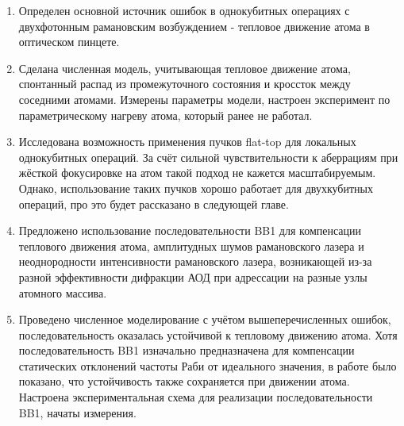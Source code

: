 \begin{enumerate}
	\item Определен основной источник ошибок в однокубитных операциях с двухфотонным рамановским возбуждением - тепловое движение атома в оптическом пинцете.
	\item Сделана численная модель, учитывающая тепловое движение атома, спонтанный распад из промежуточного состояния и кроссток между соседними атомами. Измерены параметры модели, настроен эксперимент по параметрическому нагреву атома, который ранее не работал.
	\item Исследована возможность применения пучков flat-top для локальных однокубитных операций. За счёт сильной чувствительности к аберрациям при жёсткой фокусировке на атом такой подход не кажется масштабируемым. Однако, использование таких пучков хорошо работает для двухкубитных операций, про это будет рассказано в следующей главе.
	\item Предложено использование последовательности BB1 для компенсации теплового движения атома, амплитудных шумов рамановского лазера и неоднородности интенсивности рамановского лазера, возникающей из-за разной эффективности дифракции АОД при адрессации на разные узлы атомного массива. 
	\item Проведено численное моделирование с учётом вышеперечисленных ошибок, последовательность оказалась устойчивой к тепловому движению атома. Хотя последовательность BB1 изначально предназначена для компенсации статических отклонений частоты Раби от идеального значения, в работе было показано, что устойчивость также сохраняется при движении атома. Настроена экспериментальная схема для реализации последовательности BB1, начаты измерения.
\end{enumerate}

\newpage